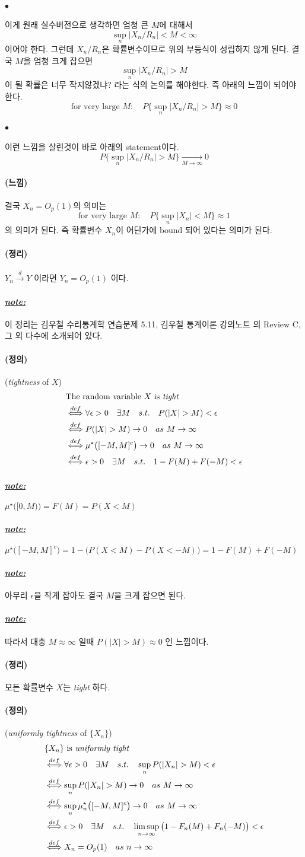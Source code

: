 \documentclass[12pt,oneside,english]{book}
\def\ck{\paragraph{\Large$\bullet$}\Large}
\def\dfn{\paragraph{\Large(정의)}\Large}
\def\thm{\paragraph{\Large(정리)}\Large}
\def\fl{\paragraph{\Large(느낌)}\Large}
\def\note{\paragraph{\Large\textit{\underline{note:}}}\Large}
\begin{document}
\ck 이게 원래 실수버전으로 생각하면 엄청 큰 $M$에 대해서 
\[
\sup_{n}|X_n / R_n| < M < \infty
\]
이어야 한다. 그런데 $X_n/R_n$은 확률변수이므로 위의 부등식이 성립하지 않게 된다. 결국 $M$을 엄청 크게 잡으면 
\[
\sup_{n}|X_n / R_n| > M 
\]
이 될 확률은 너무 작지않겠냐? 라는 식의 논의를 해야한다. 즉 아래의 느낌이 되어야 한다. 
\[
\mbox{for very large $M$}:\quad P\{\sup_{n}|X_n / R_n| > M \} \approx 0
\]

\ck 이런 느낌을 살린것이 바로 아래의 statement이다. 
\[
P\{\sup_{n}|X_n / R_n| > M \} \underset{M\to\infty}{\to} 0
\]

\fl 결국 $X_n=O_p(1)$의 의미는 
\[
\mbox{for very large $M$}:\quad  P\{\sup_n|X_n| < M \} \approx 1 
\]
의 의미가 된다. 즉 확률변수 $X_n$이 어딘가에 bound 되어 있다는 의미가 된다. 

\thm $Y_n \overset{d}{\to} Y$ 이라면 $Y_n=O_p(1)$ 이다. 

\note 이 정리는 김우철 수리통계학 \cite{Kim2011}  연습문제 5.11, 김우철 통계이론 강의노트 \cite{Kim2012} 의 Review C, 그 외 다수에 소개되어 있다. 

\dfn (\emph{tightness} of $X$) 
\begin{align*}
& \mbox{The random variable $X$ is \emph{tight}} \\
& \overset{def}{\Longleftrightarrow} \forall \epsilon>0 \quad \exists M \quad s.t. \quad P(|X|>M)<\epsilon \\ 
& \overset{def}{\Longleftrightarrow} P(|X|>M) \to 0 \quad as ~ M\to \infty \\ 
& \overset{def}{\Longleftrightarrow} \mu^{\star}\big([-M,M]^c\big) \to 0 \quad as ~ M \to \infty \\ 
& \overset{def}{\Longleftrightarrow} \epsilon>0 \quad \exists M \quad s.t. \quad 1-F(M)+F(-M) < \epsilon 
\end{align*}

\note $\mu^{\star}\big([0,M)\big)=F(M)=P(X<M)$

\note $\mu^{\star}\big([-M,M]^c\big)=1-\big(P(X<M)-P(X<-M)\big)=1-F(M)+F(-M)$
\note 아무리 $\epsilon$을 작게 잡아도 결국 $M$을 크게 잡으면 된다. 

\note 따라서 대충 $M \approx \infty$ 일때 $P(|X|>M) \approx 0$ 인 느낌이다. 

\thm 모든 확률변수 $X$는 \emph{tight} 하다.
 
\dfn (\emph{uniformly tightness} of $\{X_n\}$) 
\begin{align*}
& \mbox{$\{X_n\}$ is \emph{uniformly tight}} \\
& \overset{def}{\Longleftrightarrow} \forall \epsilon>0 \quad \exists M \quad s.t. \quad \sup_nP(|X_n|>M)<\epsilon \\ 
& \overset{def}{\Longleftrightarrow} \sup_n P(|X_n|>M) \to 0 \quad as ~ M\to \infty \\ 
& \overset{def}{\Longleftrightarrow} \sup_n\mu_n^{\star}\big([-M,M]^c\big) \to 0 \quad as ~ M \to \infty \\ 
& \overset{def}{\Longleftrightarrow} \epsilon>0 \quad \exists M \quad s.t. \quad \limsup_{n\to\infty} \big(1-F_n(M)+F_n(-M)\big) < \epsilon \\ 
& \overset{def}{\Longleftrightarrow} X_n=O_p(1) \quad as ~ n\to\infty 
\end{align*}
\end{document}
